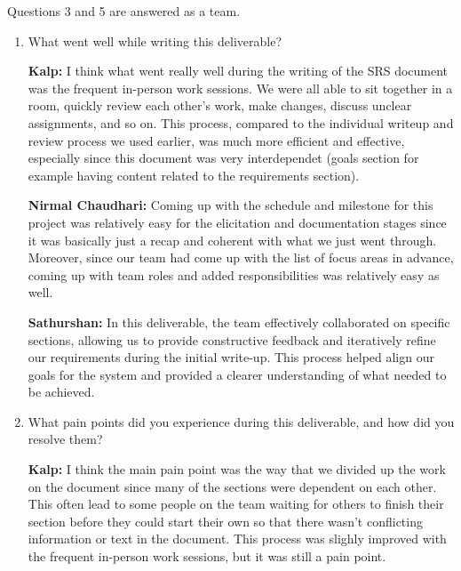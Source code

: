 Questions 3 and 5 are answered as a team.

\begin{enumerate}
  \item What went well while writing this deliverable? 

  \textbf{Kalp:} I think what went really well during the writing of the SRS
  document was the frequent in-person work sessions. We were all able to sit 
  together in a room, quickly review each other's work, make changes, discuss 
  unclear assignments, and so on. This process, compared to the individual 
  writeup and review process we used earlier, was much more efficient and 
  effective, especially since this document was very interdependet (goals
  section for example having content related to the requirements section).
  
  \textbf{Nirmal Chaudhari:} Coming up with the schedule and milestone for this
  project was relatively easy for the elicitation and documentation stages 
  since it was basically just a recap and coherent with what we just went 
  through. Moreover, since our team had come up with the list of focus areas 
  in advance, coming up with team roles and added responsibilities was 
  relatively easy as well. 
  
  \textbf{Sathurshan:} In this deliverable, the team effectively collaborated on
  specific sections, allowing us to provide constructive feedback and
  iteratively refine our requirements during the initial write-up. This process
  helped align our goals for the system and provided a clearer understanding of
  what needed to be achieved.

  \item What pain points did you experience during this deliverable, and how did
  you resolve them?

  \textbf{Kalp:} I think the main pain point was the way that we divided up the 
  work on the document since many of the sections were dependent on each other.
  This often lead to some people on the team waiting for others to finish their
  section before they could start their own so that there wasn't conflicting
  information or text in the document. This process was slighly improved with 
  the frequent in-person work sessions, but it was still a pain point.
  

\end{enumerate}
